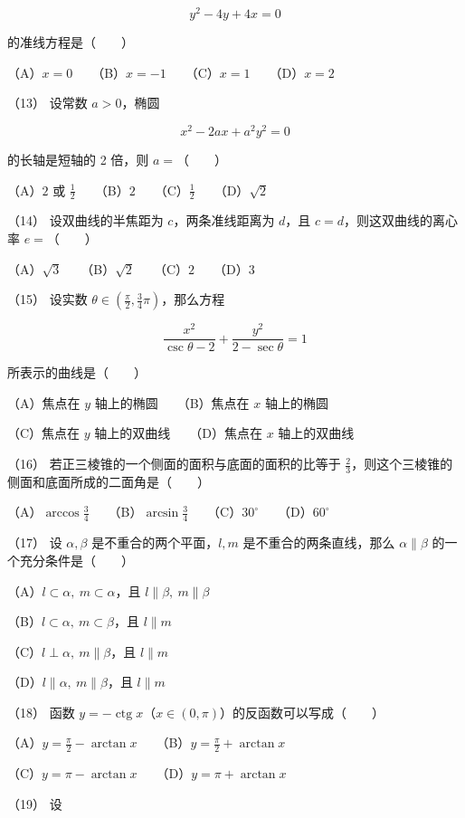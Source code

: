 \begin{answer}
\nopagebreak[4]
\[
y^2-4y+4x=0
\]

的准线方程是\mbox{（　　）}

（A）$x=0$　　（B）$x=-1$　　（C）$x=1$　　（D）$x=2$

（13） 设常数 $a>0$，椭圆

\nopagebreak[4]
\[
x^2-2ax+a^2y^2=0
\]

的长轴是短轴的 2 倍，则 $a=$\mbox{（　　）}

（A）$2$ 或 $\frac12$　　（B）$2$　　（C）$\frac12$　　（D）$\sqrt2$

（14） 设双曲线的半焦距为 $c$，两条准线距离为 $d$，且 $c=d$，则这双曲线的离心率 $e=$\mbox{（　　）}

（A）$\sqrt3$　　（B）$\sqrt2$　　（C）$2$　　（D）$3$

（15） 设实数 $\theta\in\left(\frac\pi2,\frac34\pi\right)$，那么方程

\nopagebreak[4]
\[
\frac{x^2}{\csc\theta-2}+\frac{y^2}{2-\sec\theta}=1
\]

所表示的曲线是\mbox{（　　）}

（A）焦点在 $y$ 轴上的椭圆　　（B）焦点在 $x$ 轴上的椭圆

（C）焦点在 $y$ 轴上的双曲线　　（D）焦点在 $x$ 轴上的双曲线

（16） 若正三棱锥的一个侧面的面积与底面的面积的比等于 $\frac23$，则这个三棱锥的侧面和底面所成的二面角是\mbox{（　　）}

（A）$\arccos\frac34$　　（B）$\arcsin\frac34$　　（C）$30^\circ$　　（D）$60^\circ$

（17） 设 $\alpha,\beta$ 是不重合的两个平面，$l,m$ 是不重合的两条直线，那么 $\alpha\parallel\beta$ 的一个充分条件是\mbox{（　　）}

（A）$l\subset\alpha,\ m\subset\alpha$，且 $l\parallel\beta,\ m\parallel\beta$

（B）$l\subset\alpha,\ m\subset\beta$，且 $l\parallel m$

（C）$l\perp\alpha,\ m\parallel\beta$，且 $l\parallel m$

（D）$l\parallel\alpha,\ m\parallel\beta$，且 $l\parallel m$

（18） 函数 $y=-\operatorname{ctg}x$（$x\in(0,\pi)$）的反函数可以写成\mbox{（　　）}

（A）$y=\frac\pi2-\arctan x$　　（B）$y=\frac\pi2+\arctan x$

（C）$y=\pi-\arctan x$　　（D）$y=\pi+\arctan x$

（19） 设


\end{answer}
